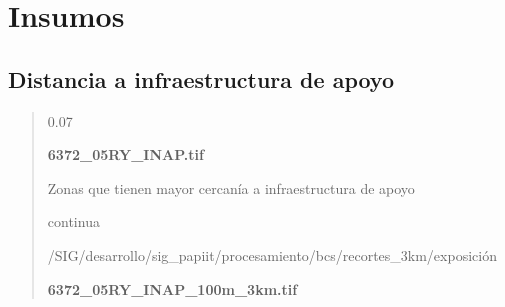 \documentclass[letterpaper,10pt,spanish]{sphinxmanual}
\begin{document}
\section{Insumos}
\label{\detokenize{exposicion_bcs:insumos}}

\subsection{Distancia a infraestructura de apoyo}
\label{\detokenize{exposicion_bcs:distancia-a-infraestructura-de-apoyo}}\begin{quote}


 0.07

 {\color{red}\bfseries{}\textbar{}6372\_05RY\_INAP.tif\textbar{}}

 Zonas que tienen mayor cercanía a infraestructura de apoyo

 continua


 /SIG/desarrollo/sig\_papiit/procesamiento/bcs/recortes\_3km/exposición

  {\color{red}\bfseries{}\textbar{}6372\_05RY\_INAP\_100m\_3km.tif\textbar{}}
\begin{quote}

\end{quote}
\end{quote}
\end{document}
